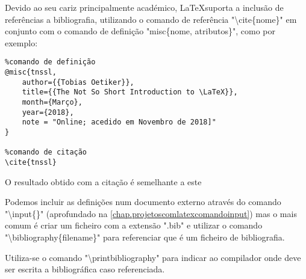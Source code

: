 Devido ao seu cariz principalmente académico, \LaTeX suporta a inclusão de referências a bibliografia, utilizando o comando de referência "\textbackslash cite\{nome\}" em conjunto com o comando de definição "\@ misc\{nome, atributos\}", como por exemplo:

\begin{verbatim}
%comando de definição
@misc{tnssl,
    author={{Tobias Oetiker}},
    title={{The Not So Short Introduction to \LaTeX}},
    month={Março},
    year={2018},
    note = "Online; acedido em Novembro de 2018]"
}

%comando de citação
\cite{tnssl}
\end{verbatim}
 
O resultado obtido com a citação é semelhante a este \cite{tnssl}

Podemos incluir as definições num documento externo através do comando "\textbackslash input\{\}" (aprofundado na \autoref{chap.projetoscomlatexcomandoinput}) mas o mais comum é criar um ficheiro com a extensão ".bib" e utilizar o comando "\textbackslash bibliography\{filename\}" para referenciar que é um ficheiro de bibliografia.

Utiliza-se o comando "\textbackslash printbibliography" para indicar ao compilador onde deve ser escrita a bibliográfica caso referenciada.

